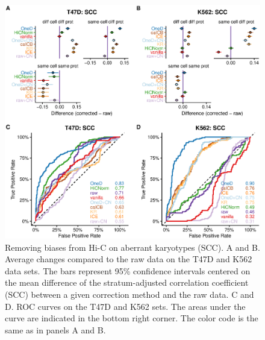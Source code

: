 \documentclass[12pt]{report}
\begin{document}
\begin{figure}
	\centerline{\includegraphics[width=\textwidth]{nar_figures/supp_figure_6.eps}}
  \caption{Removing biases from Hi-C on aberrant karyotypes (SCC). A and
B. Average changes compared to the raw data on the T47D and K562 data
sets. The bars represent 95\% confidence intervals centered on the mean
difference of the stratum-adjusted correlation coefficient (SCC) between a
given correction method and the raw data. C and D. ROC curves on the T47D
and K562 sets. The areas under the curve are indicated in the bottom right
corner. The color code is the same as in panels A and B.}
\end{figure}
\end{document}
